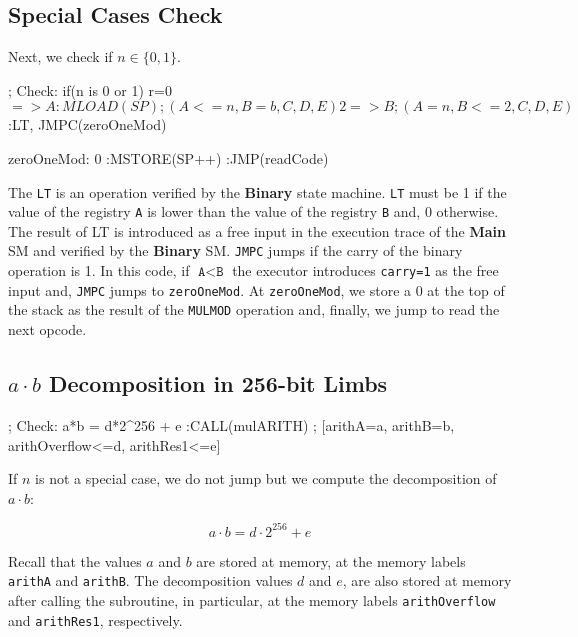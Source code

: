 \subsection{Special Cases Check}

Next, we check if $n \in \{0,1\}$.

\begin{zkasm}
  ; Check: if(n is 0 or 1) {r=0}
  $ => A         :MLOAD(SP)      ; (A<=n,B=b,C,D,E)
  2 => B                         ; (A=n,B<=2,C,D,E)
  $              :LT, JMPC(zeroOneMod)

zeroOneMod:
    0               :MSTORE(SP++)
                    :JMP(readCode)
\end{zkasm}

The \texttt{LT} is an operation verified by the \textbf{Binary} state machine. \texttt{LT} must be 1 if the value of the registry \texttt{A} is lower than the value of the registry \texttt{B} and, 0 otherwise. The result of LT is introduced as a free input in the execution trace of the \textbf{Main} SM and verified by the \textbf{Binary} SM. \texttt{JMPC} jumps if the carry of the binary operation is 1. In this code, if $\texttt{A}<\texttt{B}$ the executor introduces \texttt{carry=1} as the free input and, \texttt{JMPC} jumps to \texttt{zeroOneMod}. At \texttt{zeroOneMod}, we store a 0 at the top of the stack as the result of the \texttt{MULMOD} operation and, finally, we jump to read the next opcode.











\subsection{$a \cdot b$ Decomposition in 256-bit Limbs}
\begin{zkasm}
  ; Check: a*b = d*2^256 + e
        :CALL(mulARITH) ; [arithA=a, arithB=b, arithOverflow<=d, arithRes1<=e]
\end{zkasm}


If $n$ is not a special case, we do not jump but we compute the decomposition of $a \cdot b$:
 
$$a \cdot b = d \cdot 2^{256} + e $$

Recall that the values $a$ and $b$ are stored at memory, at the memory labels \texttt{arithA} and \texttt{arithB}. The decomposition values $d$ and $e$, are also stored at memory after calling the subroutine, in particular, at the memory labels \texttt{arithOverflow} and \texttt{arithRes1}, respectively.








